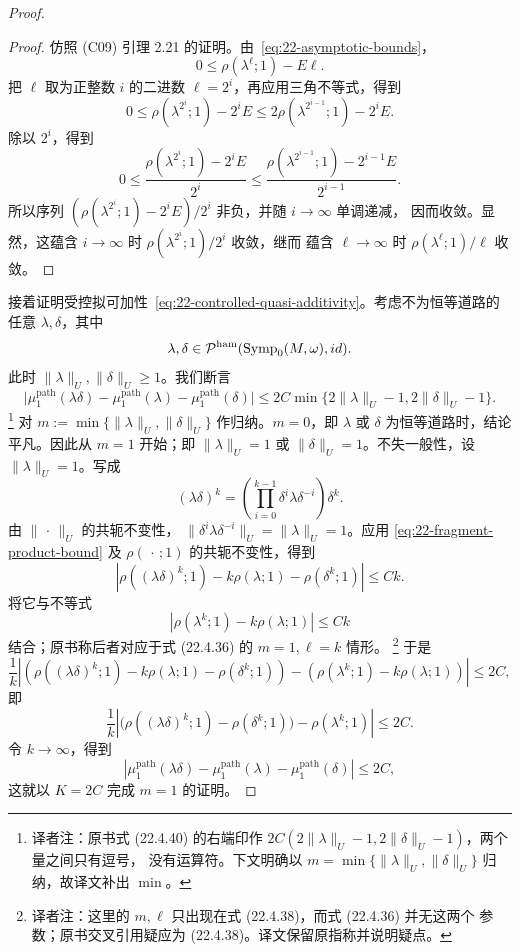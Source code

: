 \begin{proof}
\begin{proof}
仿照 (C09) 引理 2.21 的证明。由~\eqref{eq:22-asymptotic-bounds}，
\[
 0\leq\rho(\lambda^\ell;1)-E\ell.
\]
把 $\ell$ 取为正整数 $i$ 的二进数 $\ell=2^i$，再应用三角不等式，得到
\[
 0\leq\rho(\lambda^{2^i};1)-2^iE
 \leq2\rho(\lambda^{2^{i-1}};1)-2^iE.
\]
除以 $2^i$，得到
\[
 0\leq\frac{\rho(\lambda^{2^i};1)-2^iE}{2^i}
 \leq\frac{\rho(\lambda^{2^{i-1}};1)-2^{i-1}E}{2^{i-1}}.
\]
所以序列 $(\rho(\lambda^{2^i};1)-2^iE)/2^i$ 非负，并随 $i\to\infty$ 单调递减，
因而收敛。显然，这蕴含 $i\to\infty$ 时 $\rho(\lambda^{2^i};1)/2^i$ 收敛，继而
蕴含 $\ell\to\infty$ 时 $\rho(\lambda^\ell;1)/\ell$ 收敛。
\end{proof}

接着证明受控拟可加性~\eqref{eq:22-controlled-quasi-additivity}。考虑不为恒等道路的任意
$\lambda,\delta$，其中
\[
 \lambda,\delta\in\mathcal P^{\mathrm{ham}}(\operatorname{Symp}_0(M,\omega),id).
\]
此时
$\lVert\lambda\rVert_U,\lVert\delta\rVert_U\geq1$。我们断言
\begin{equation}
 \bigl|\mu_1^{\mathrm{path}}(\lambda\delta)
 -\mu_1^{\mathrm{path}}(\lambda)-\mu_1^{\mathrm{path}}(\delta)\bigr|
 \leq2C\min\{2\lVert\lambda\rVert_U-1,2\lVert\delta\rVert_U-1\}.
 \label{eq:22-controlled-induction}
\end{equation}
\footnote{译者注：原书式 (22.4.40) 的右端印作
$2C(2\lVert\lambda\rVert_U-1,2\lVert\delta\rVert_U-1)$，两个量之间只有逗号，
没有运算符。下文明确以
$m=\min\{\lVert\lambda\rVert_U,\lVert\delta\rVert_U\}$ 归纳，故译文补出
$\min$。}
对 $m:=\min\{\lVert\lambda\rVert_U,\lVert\delta\rVert_U\}$ 作归纳。$m=0$，即
$\lambda$ 或 $\delta$ 为恒等道路时，结论平凡。因此从 $m=1$ 开始；即
$\lVert\lambda\rVert_U=1$ 或 $\lVert\delta\rVert_U=1$。不失一般性，设
$\lVert\lambda\rVert_U=1$。写成
\begin{equation}
 (\lambda\delta)^k
 =\left(\prod_{i=0}^{k-1}\delta^i\lambda\delta^{-i}\right)\delta^k.
 \label{eq:22-conjugate-product}
\end{equation}
由 $\lVert\,\cdot\,\rVert_U$ 的共轭不变性，
$\lVert\delta^i\lambda\delta^{-i}\rVert_U=\lVert\lambda\rVert_U=1$。应用
\eqref{eq:22-fragment-product-bound} 及 $\rho(\,\cdot\,;1)$ 的共轭不变性，得到
\[
 |\rho((\lambda\delta)^k;1)-k\rho(\lambda;1)-\rho(\delta^k;1)|\leq Ck.
\]
将它与不等式
\[
 |\rho(\lambda^k;1)-k\rho(\lambda;1)|\leq Ck
\]
结合；原书称后者对应于式 (22.4.36) 的 $m=1,\ell=k$ 情形。
\footnote{译者注：这里的 $m,\ell$ 只出现在式 (22.4.38)，而式 (22.4.36) 并无这两个
参数；原书交叉引用疑应为 (22.4.38)。译文保留原指称并说明疑点。}
于是
\[
 \frac1k\left|
 (\rho((\lambda\delta)^k;1)-k\rho(\lambda;1)-\rho(\delta^k;1))
 -(\rho(\lambda^k;1)-k\rho(\lambda;1))\right|\leq2C,
\]
即
\[
 \frac1k\left|\bigl(\rho((\lambda\delta)^k;1)-\rho(\delta^k;1)\bigr)
 -\rho(\lambda^k;1)\right|\leq2C.
\]
令 $k\to\infty$，得到
\[
 |\mu_1^{\mathrm{path}}(\lambda\delta)-\mu_1^{\mathrm{path}}(\lambda)
 -\mu_1^{\mathrm{path}}(\delta)|\leq2C,
\]
这就以 $K=2C$ 完成 $m=1$ 的证明。


\end{proof}
